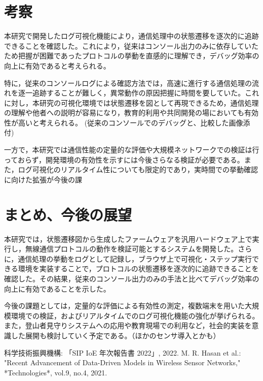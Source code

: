 \documentclass[paper]{ieicej}
\begin{document}
\section{考察}
本研究で開発したログ可視化機能により，通信処理中の状態遷移を逐次的に追跡できることを確認した。これにより，従来はコンソール出力のみに依存していたため把握が困難であったプロトコルの挙動を直感的に理解でき，デバッグ効率の向上に有効であると考えられる。

特に，従来のコンソールログによる確認方法では，高速に進行する通信処理の流れを逐一追跡することが難しく，異常動作の原因把握に時間を要していた。これに対し，本研究の可視化環境では状態遷移を図として再現できるため，通信処理の理解や他者への説明が容易になり，教育的利用や共同開発の場においても有効性が高いと考えられる。
(従来のコンソールでのデバッグと、比較した画像添付)

一方で，本研究では通信性能の定量的な評価や大規模ネットワークでの検証は行っておらず，開発環境の有効性を示すには今後さらなる検証が必要である。また，ログ可視化のリアルタイム性についても限定的であり，実時間での挙動確認に向けた拡張が今後の課


\section{まとめ、今後の展望}
本研究では，状態遷移図から生成したファームウェアを汎用ハードウェア上で実行し，無線通信プロトコルの動作を検証可能とするシステムを開発した。さらに，通信処理の挙動をログとして記録し，ブラウザ上で可視化・ステップ実行できる環境を実装することで，プロトコルの状態遷移を逐次的に追跡できることを確認した。その結果，従来のコンソール出力のみの手法と比べてデバッグ効率の向上に有効であることを示した。

今後の課題としては，定量的な評価による有効性の測定，複数端末を用いた大規模環境での検証，およびリアルタイムでのログ可視化機能の強化が挙げられる。また，登山者見守りシステムへの応用や教育現場での利用など，社会的実装を意識した展開も検討していく予定である。（ほかのセンサ導入とかも）


\baselineskip
%
%

\begin{thebibliography}{99}
 科学技術振興機構: 「SIP IoE 年次報告書 2022」, 2022.
 M. R. Hasan et al.: "Recent Advancement of Data-Driven Models in Wireless Sensor Networks," *Technologies*, vol.9, no.4, 2021.
\end{thebibliography}

\appendix
\section{}
\end{document}

